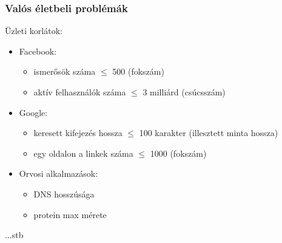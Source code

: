 \begin{frame}
\frametitle{Valós életbeli problémák}

Üzleti korlátok:

\begin{itemize}
\item Facebook:
\begin{itemize}
\item ismerősök száma $\leq{}$ 500 (fokszám)
\item aktív felhasználók száma $\leq{}$ 3 milliárd (csúcsszám)
\end{itemize}
\item Google:
\begin{itemize}
\item keresett kifejezés hossza $\leq{}$ 100 karakter (illesztett minta hossza)
\item egy oldalon a linkek száma $\leq{}$ 1000 (fokszám)
\end{itemize}
\item Orvosi alkalmazások:
\begin{itemize}
\item DNS hosszúsága
\item protein max mérete
\end{itemize}
\end{itemize}
...stb
\end{frame}

